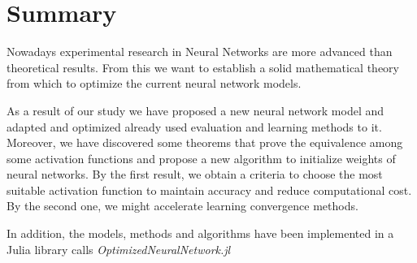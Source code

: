 %

\chapter*{Summary}\label{ch:summary}

Nowadays experimental research in Neural Networks are more advanced than theoretical
results. 
From this we want to establish a solid mathematical theory from which to optimize the current neural network models. 


As a result of our study we have proposed a new neural 
network model and adapted and optimized already used 
evaluation and learning methods to it. 
Moreover, we have discovered some theorems that prove the 
equivalence among some activation functions and propose a new
 algorithm to initialize weights of neural networks. By the 
first result, we obtain a criteria to choose the most 
suitable activation function to maintain accuracy and reduce computational cost.
 By the second one, we might accelerate 
learning convergence methods.

In addition, the models, methods and algorithms have been 
implemented in a Julia library calls \textit{OptimizedNeuralNetwork.jl}

